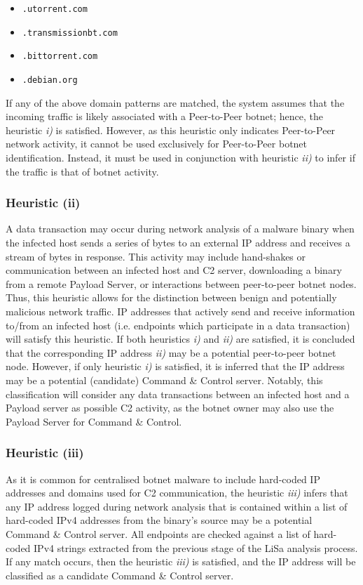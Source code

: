 \begin{itemize}
    \item \texttt{.utorrent.com}
    \item \texttt{.transmissionbt.com}
    \item \texttt{.bittorrent.com}
    \item \texttt{.debian.org}
\end{itemize}

If any of the above domain patterns are matched, the system assumes that the incoming traffic is likely associated with a Peer-to-Peer botnet; hence, the heuristic \textit{i)} is satisfied. However, as this heuristic only indicates Peer-to-Peer network activity, it cannot be used exclusively for Peer-to-Peer botnet identification. Instead, it must be used in conjunction with heuristic \textit{ii)} to infer if the traffic is that of botnet activity.

\subsubsection{Heuristic (ii)} A data transaction may occur during network analysis of a malware binary when the infected host sends a series of bytes to an external IP address and receives a stream of bytes in response. This activity may include hand-shakes or communication between an infected host and C2 server, downloading a binary from a remote Payload Server, or interactions between peer-to-peer botnet nodes. Thus, this heuristic allows for the distinction between benign and potentially malicious network traffic. IP addresses that actively send and receive information to/from an infected host (i.e. endpoints which participate in a data transaction) will satisfy this heuristic. If both heuristics \textit{i)} and \textit{ii)} are satisfied, it is concluded that the corresponding IP address \textit{ii)} may be a potential peer-to-peer botnet node. However, if only heuristic \textit{i)} is satisfied, it is inferred that the IP address may be a potential (candidate) Command \& Control server. Notably, this classification will consider any data transactions between an infected host and a Payload server as possible C2 activity, as the botnet owner may also use the Payload Server for Command \& Control.

\subsubsection{Heuristic (iii)} As it is common for centralised botnet malware to include hard-coded IP addresses and domains used for C2 communication, the heuristic \textit{iii)} infers that any IP address logged during network analysis that is contained within a list of hard-coded IPv4 addresses from the binary's source may be a potential Command \& Control server. All endpoints are checked against a list of hard-coded IPv4 strings extracted from the previous stage of the LiSa analysis process. If any match occurs, then the heuristic \textit{iii)} is satisfied, and the IP address will be classified as a candidate Command \& Control server.

